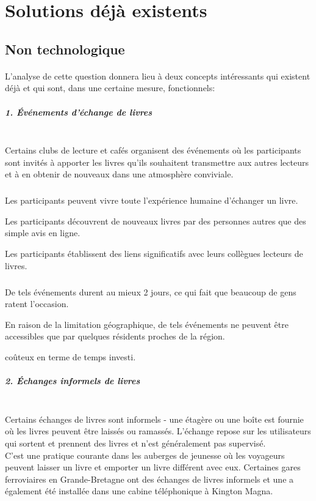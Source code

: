 \section{Solutions déjà existents}

\subsection{Non technologique}

\paragraph*{}
L'analyse de cette question donnera lieu à deux concepts intéressants qui existent déjà et qui sont, dans une certaine mesure, fonctionnels:

\subparagraph{{\large 1. Événements d'échange de livres}\\\\}
\tab Certains clubs de lecture et cafés organisent des événements où les participants sont invités à apporter les livres qu'ils souhaitent transmettre aux autres lecteurs et à en obtenir de nouveaux dans une atmosphère conviviale.

\subparagraph*{}
\begin{list}{•}{\textbf{Avantages}}
	\item Les participants peuvent vivre toute l'expérience humaine d'échanger un livre.
	\item Les participants découvrent de nouveaux livres par des personnes autres que des simple avis en ligne.
	\item Les participants établissent des liens significatifs avec leurs collègues lecteurs de livres.
\end{list}

\subparagraph*{}
\begin{list}{•}{\textbf{Inconvénients}}
	\item De tels événements durent au mieux 2 jours, ce qui fait que beaucoup de gens ratent l'occasion.
	\item En raison de la limitation géographique, de tels événements ne peuvent être accessibles que par quelques résidents proches de la région.
	\item coûteux en terme de temps investi.
\end{list}

\newpage

\subparagraph{{\large 2. Échanges informels de livres}\\\\}
Certains échanges de livres sont informels - une étagère ou une boîte est fournie où les livres peuvent être laissés ou ramassés. L'échange repose sur les utilisateurs qui sortent et prennent des livres et n'est généralement pas supervisé.\\
\tab C'est une pratique courante dans les auberges de jeunesse où les voyageurs peuvent laisser un livre et emporter un livre différent avec eux. Certaines gares ferroviaires en Grande-Bretagne ont des échanges de livres informels et une a également été installée dans une cabine téléphonique à Kington Magna\cite{noauthor_book_2019}.

